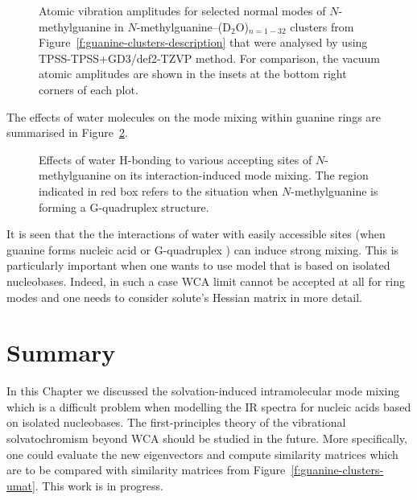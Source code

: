 \documentclass[b5paper,oneside,fleqn,11pt]{book}
\begin{document}
\begin{refsection}
\begin{figure}[t!]
{}
\caption{
Atomic vibration amplitudes for selected normal modes of
$N$-methylguanine
in $N$-methylguanine--(D$_2$O)$_{n=1-32}$ clusters from 
Figure~\ref{f:guanine-clusters-description} that were analysed
by using TPSS-TPSS+GD3/def2-TZVP method. For comparison, the vacuum atomic amplitudes
are shown in the insets at the bottom right corners of each plot.
\label{f:guanine-clusters-amplitudes}}
\end{figure}
%

The effects of water molecules on the mode mixing
within guanine rings are summarised in Figure~\ref{f:guanine-clusters-summary}.
%
\begin{figure}[t!]
\centering
\setlength\fboxsep{0.4pt}
\setlength\fboxrule{0.5pt}
\caption{
Effects of water H-bonding to various accepting sites
of $N$-methylguanine on its interaction\hyp{}induced mode mixing.
The region indicated in red box refers to the situation
when $N$-methylguanine is forming a G-quadruplex structure. \citep{Peng.Jones.Tokmakoff.JACS.2011}
\label{f:guanine-clusters-summary}}
\end{figure}
%
It is seen that the the interactions of water with easily accessible sites (when guanine
forms nucleic acid or G-quadruplex \citep{Peng.Jones.Tokmakoff.JACS.2011}) 
can induce strong mixing.
This is particularly important when one wants to use model that
is based on isolated nucleobases. Indeed, in such a case WCA
limit cannot be accepted at all for ring modes and one needs to consider
solute's Hessian matrix in more detail.

\section{Summary}

In this Chapter we discussed the solvation\hyp{}induced
intramolecular mode mixing which is a difficult problem
when modelling the IR spectra for nucleic acids based on
isolated nucleobases. The first\hyp{}principles theory
of the vibrational solvatochromism beyond WCA should be studied
in the future. More specifically, one could evaluate
the new eigenvectors and compute similarity matrices
which are to be compared with similarity matrices from
Figure~\ref{f:guanine-clusters-umat}. This work is in progress.






\end{refsection}
\end{document}
